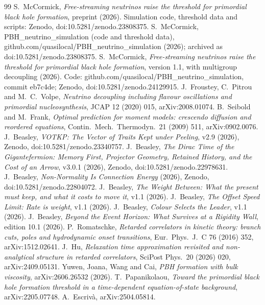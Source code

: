 \documentclass[11pt]{article}
\begin{document}
\begin{thebibliography}{99}
 S.~McCormick, \emph{Free-streaming neutrinos raise the threshold for primordial black hole formation}, preprint (2026). Simulation code, threshold data and scripts: Zenodo, doi:10.5281/zenodo.23808375.
 S.~McCormick, PBH\_neutrino\_simulation (code and threshold data), github.com/quasilocal/PBH\_neutrino\_simulation (2026); archived as doi:10.5281/zenodo.23808375.
 S.~McCormick, \emph{Free-streaming neutrinos raise the threshold for primordial black hole formation}, version 1.1, with multigroup decoupling (2026). Code: github.com/quasilocal/PBH\_neutrino\_simulation, commit eb7c4de; Zenodo, doi:10.5281/zenodo.24129915.
 J.~Froustey, C.~Pitrou and M.~C.~Volpe, \emph{Neutrino decoupling including flavour oscillations and primordial nucleosynthesis}, JCAP 12 (2020) 015, arXiv:2008.01074.
 B.~Seibold and M.~Frank, \emph{Optimal prediction for moment models: crescendo diffusion and reordered equations}, Contin.\ Mech.\ Thermodyn.\ 21 (2009) 511, arXiv:0902.0076.
 J.~Beasley, \emph{VOTKP: The Vector of Traits Kept under Peeling}, v2.9 (2026), Zenodo, doi:10.5281/zenodo.23340757.
 J.~Beasley, \emph{The Dirac Time of the Gigantefermion: Memory First, Projector Geometry, Retained History, and the Cost of an Arrow}, v3.0.1 (2026), Zenodo, doi:10.5281/zenodo.22978631.
 J.~Beasley, \emph{Non-Normality Is Connection Energy} (2026), Zenodo, doi:10.5281/zenodo.22804072.
 J.~Beasley, \emph{The Weight Between: What the present must keep, and what it costs to move it}, v1.1 (2026).
 J.~Beasley, \emph{The Offset Speed Limit: Rate is weight}, v1.1 (2026).
 J.~Beasley, \emph{Colour Selects the Leader}, v1.1 (2026).
 J.~Beasley, \emph{Beyond the Event Horizon: What Survives at a Rigidity Wall}, edition 10.1 (2026).
 P.~Romatschke, \emph{Retarded correlators in kinetic theory: branch cuts, poles and hydrodynamic onset transitions}, Eur.\ Phys.\ J.\ C 76 (2016) 352, arXiv:1512.02641.
 J.~Hu, \emph{Relaxation time approximation revisited and non-analytical structure in retarded correlators}, SciPost Phys.\ 20 (2026) 020, arXiv:2409.05131.
 Yuwen, Joana, Wang and Cai, \emph{PBH formation with bulk viscosity}, arXiv:2606.26532 (2026).
 T.~Papanikolaou, \emph{Toward the primordial black hole formation threshold in a time-dependent equation-of-state background}, arXiv:2205.07748.
 A.~Escriv\`a, arXiv:2504.05814.

\end{thebibliography}
\end{document}

